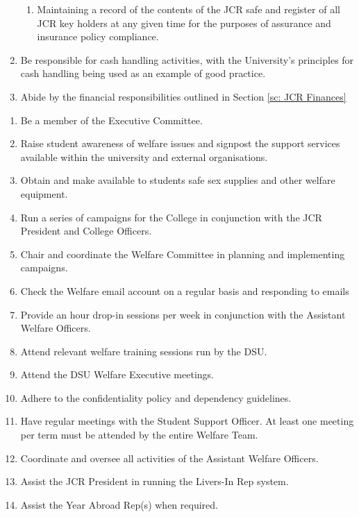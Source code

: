 \begin{enumerate}
\begin{enumerate}
            \item Maintaining a record of the contents of the JCR safe and register of all JCR key holders at any given time for the purposes of assurance and insurance policy compliance.
        \end{enumerate}
    \item Be responsible for cash handling activities, with the University’s principles for cash handling being used as an example of good practice.
    \item Abide by the financial responsibilities outlined in Section \ref{sc: JCR Finances}
\end{enumerate}

\begin{enumerate}
    \item Be a member of the Executive Committee.
    \item Raise student awareness of welfare issues and signpost the support services available within the university and external organisations.
    \item Obtain and make available to students safe sex supplies and other welfare equipment.
    \item Run a series of campaigns for the College in conjunction with the JCR President and College Officers. 
    \item Chair and coordinate the Welfare Committee in planning and implementing campaigns.  
    \item Check the Welfare email account on a regular basis and responding to emails
    \item Provide an hour drop-in sessions per week in conjunction with the Assistant Welfare Officers.
    \item Attend relevant welfare training sessions run by the DSU.
    \item Attend the DSU Welfare Executive meetings.
    \item Adhere to the confidentiality policy and dependency guidelines.
    \item Have regular meetings with the Student Support Officer. At least one meeting per term must be attended by the entire Welfare Team.
    \item Coordinate and oversee all activities of the Assistant Welfare Officers.
    \item Assist the JCR President in running the Livers-In Rep system.
    \item Assist the Year Abroad Rep(s) when required.

\end{enumerate}
